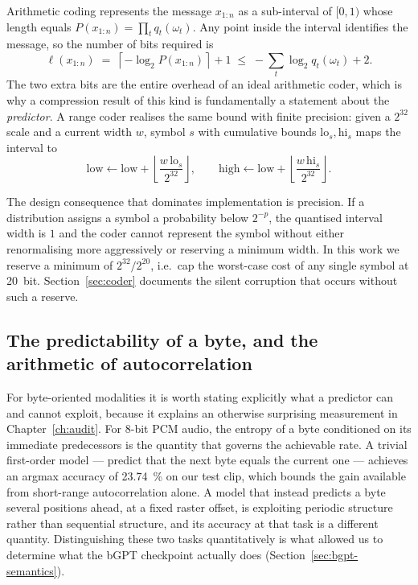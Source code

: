 \documentclass[11pt,a4paper]{article}
\begin{document}
Arithmetic coding represents the message $x_{1:n}$ as a sub-interval of $[0,1)$
whose length equals $P(x_{1:n}) = \prod_t q_t(\omega_t)$. Any point inside the
interval identifies the message, so the number of bits required is
\begin{equation}
\ell(x_{1:n}) \;=\; \left\lceil -\log_2 P(x_{1:n}) \right\rceil + 1
\;\le\; -\sum_t \log_2 q_t(\omega_t) + 2 .
\end{equation}
The two extra bits are the entire overhead of an ideal arithmetic coder, which is
why a compression result of this kind is fundamentally a statement about the
\emph{predictor}. A range coder realises the same bound with finite precision:
given a $2^{32}$ scale and a current width $w$, symbol $s$ with cumulative
bounds $\mathrm{lo}_s, \mathrm{hi}_s$ maps the interval to
\begin{equation}
\mathrm{low} \leftarrow \mathrm{low} + \left\lfloor \frac{w\,\mathrm{lo}_s}{2^{32}}\right\rfloor,
\qquad
\mathrm{high} \leftarrow \mathrm{low} + \left\lfloor \frac{w\,\mathrm{hi}_s}{2^{32}}\right\rfloor .
\label{eq:renorm}
\end{equation}

The design consequence that dominates implementation is precision. If a
distribution assigns a symbol a probability below $2^{-p}$, the quantised
interval width is $1$ and the coder cannot represent the symbol without either
renormalising more aggressively or reserving a minimum width. In this work we
reserve a minimum of $2^{32}/2^{20}$, i.e.\ cap the worst-case cost of any single
symbol at \SI{20}{bit}. Section~\ref{sec:coder} documents the silent corruption
that occurs without such a reserve.

\subsection{The predictability of a byte, and the arithmetic of autocorrelation}

For byte-oriented modalities it is worth stating explicitly what a predictor can
and cannot exploit, because it explains an otherwise surprising measurement in
Chapter~\ref{ch:audit}. For 8-bit PCM audio, the entropy of a byte conditioned on
its immediate predecessors is the quantity that governs the achievable rate. A
trivial first-order model --- predict that the next byte equals the current one
--- achieves an argmax accuracy of \SI{23.74}{\%} on our test clip, which
bounds the gain available from short-range autocorrelation alone. A model that
instead predicts a byte several positions ahead, at a fixed raster offset, is
exploiting periodic structure rather than sequential structure, and its accuracy
at that task is a different quantity. Distinguishing these two tasks
quantitatively is what allowed us to determine what the bGPT checkpoint actually
does (Section~\ref{sec:bgpt-semantics}).
\end{document}
